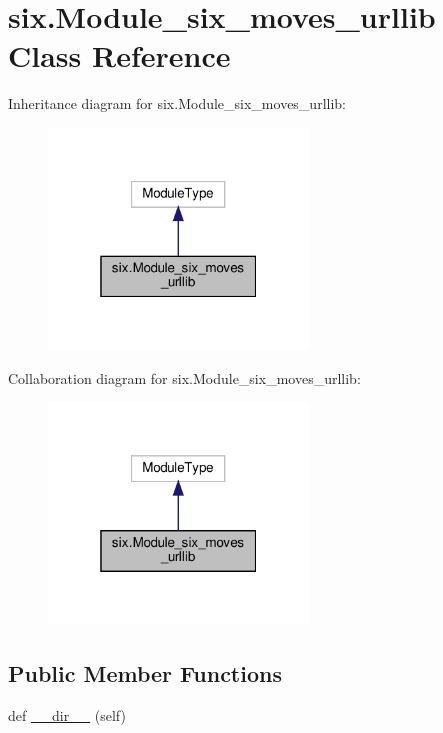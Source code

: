 \hypertarget{classsix_1_1Module__six__moves__urllib}{}\section{six.\+Module\+\_\+six\+\_\+moves\+\_\+urllib Class Reference}
\label{classsix_1_1Module__six__moves__urllib}


Inheritance diagram for six.\+Module\+\_\+six\+\_\+moves\+\_\+urllib\+:
\nopagebreak
\begin{figure}[H]
\begin{center}
\leavevmode
\includegraphics[width=196pt]{classsix_1_1Module__six__moves__urllib__inherit__graph}
\end{center}
\end{figure}


Collaboration diagram for six.\+Module\+\_\+six\+\_\+moves\+\_\+urllib\+:
\nopagebreak
\begin{figure}[H]
\begin{center}
\leavevmode
\includegraphics[width=196pt]{classsix_1_1Module__six__moves__urllib__coll__graph}
\end{center}
\end{figure}
\subsection*{Public Member Functions}
\begin{DoxyCompactItemize}
\item 
def \hyperlink{classsix_1_1Module__six__moves__urllib_ae77be536edde9596744e3e44be72154d}{\+\_\+\+\_\+dir\+\_\+\+\_\+} (self)
\end{DoxyCompactItemize}
